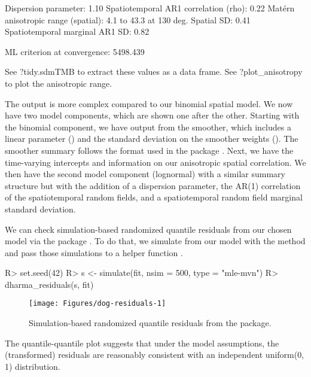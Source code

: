 \documentclass[article]{jss}\usepackage[]{graphicx}\usepackage[dvipsnames]{xcolor}
\newcommand{\fct}[1]{\code{#1()}}
\begin{document}
\begin{Schunk}
\begin{Soutput}
Dispersion parameter: 1.10
Spatiotemporal AR1 correlation (rho): 0.22
Matérn anisotropic range (spatial): 4.1 to 43.3 at 130 deg.
Spatial SD: 0.41
Spatiotemporal marginal AR1 SD: 0.82

ML criterion at convergence: 5498.439

See ?tidy.sdmTMB to extract these values as a data frame.
See ?plot_anisotropy to plot the anisotropic range.
\end{Soutput}
\end{Schunk}

The output is more complex compared to our binomial spatial model.
We now have two model components, which are shown one after the other.
Starting with the binomial component, we have output from the smoother, which includes a linear parameter () and the standard deviation on the smoother weights ().
The smoother summary follows the format used in the  package \citep{brms}.
Next, we have the time-varying intercepts and information on our anisotropic spatial correlation.
We then have the second model component (lognormal) with a similar summary structure but with the addition of a dispersion parameter, the AR(1) correlation of the spatiotemporal random fields, and a spatiotemporal random field marginal standard deviation.

We can check simulation-based randomized quantile residuals from our chosen model via the  package \citep{dharma}.
To do that, we simulate from our model with the \fct{simulate.sdmTMB} method and pass those simulations to a helper function \fct{dharma\_residuals}.

\begin{Schunk}
\begin{Sinput}
R> set.seed(42)
R> s <- simulate(fit, nsim = 500, type = "mle-mvn")
R> dharma_residuals(s, fit)
\end{Sinput}
\begin{figure}[ht]

{\centering \texttt{[image: Figures/dog-residuals-1]} 

}

\caption[Simulation-based randomized quantile residuals from the  package]{Simulation-based randomized quantile residuals from the  package.}\label{fig:dog-residuals}
\end{figure}
\end{Schunk}

The quantile-quantile plot suggests that under the model assumptions, the (transformed) residuals are reasonably consistent with an independent uniform(0, 1) distribution.
\end{document}
